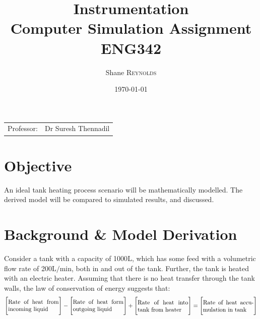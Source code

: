 \documentclass{article}
\title{Instrumentation \\ Computer Simulation Assignment \\ ENG342} %
\author{Shane \textsc{Reynolds}} %
\date{\today} %
\begin{document}
\maketitle %

\begin{center}
\begin{tabular}{l r}
Professor: & Dr Suresh Thennadil %
\end{tabular}
\end{center}


\tableofcontents
\newpage


\section{Objective}

An ideal tank heating process scenario will be mathematically modelled. The derived model will be compared to simulated results, and discussed.


\section{Background \& Model Derivation}
Consider a tank with a capacity of 1000$\si{\liter}$, which has some feed with a volumetric flow rate of 200$\si{\liter\per\minute}$, both in and out of the tank. Further, the tank is heated with an electric heater. Assuming that there is no heat transfer through the tank walls, the law of conservation of energy suggests that:
\begin{align}
\Bigg[\parbox{3cm}{Rate of heat from incoming liquid}\Bigg] - \Bigg[\parbox{3cm}{Rate of heat form outgoing liquid}\Bigg] + \Bigg[\parbox{3cm}{Rate of heat into tank from heater}\Bigg] = \Bigg[\parbox{3cm}{Rate of heat accumulation in tank}\Bigg]
\end{align}
\end{document}
